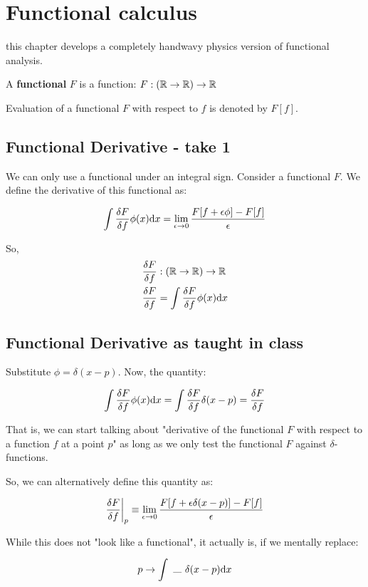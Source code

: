 \chapter{Functional calculus}

this chapter develops a completely handwavy physics version of functional
analysis.


\begin{definition}
    A \textbf{functional} $F$ is a function: $F : (\mathbb{R} \to \mathbb{R}) \to \mathbb{R}$
\end{definition}

\begin{notation}
Evaluation of a functional $F$ with respect to $f$ is denoted by $F[f]$.
\end{notation}

\section{Functional Derivative - take 1}

We can only use a functional under an integral sign. Consider a functional $F$.
We define the derivative of this functional as:

\begin{align*}
\int \fdv{F}{f} (x) \phi(x) \dd x = 
\lim_{\epsilon \to 0}
\frac{F[f + \epsilon \phi] - F[f]}{\epsilon}
\end{align*}

So,
\begin{align*}
    \fdv{F}{f} &: (\reals \to \reals) \to \reals \\
    \fdv{F}{f} (\phi) &=  \int \fdv{F}{f} (x) \phi(x) \dd x
\end{align*}

\section{Functional Derivative as taught in class}

Substitute $\phi = \delta (x - p)$. Now, the quantity:

\begin{align*}
    \int \fdv{F}{f}(x) \phi(x) \dd x = 
    \int \fdv{F}{f}(x) \delta (x - p) = 
    \fdv{F}{f} (p)
\end{align*}

That is, we can start talking about "derivative of the functional $F$ with
respect to a function $f$ at a point $p$" as long as we only test the functional $F$ against
$\delta$-functions.

So, we can alternatively define this quantity as:

\begin{align*}
\fdv{F}{f}{\bigg \rvert_p} \equiv 
\lim_{\epsilon \to 0} \frac{F[f + \epsilon \delta (x - p)] - F[f]}{\epsilon}
\end{align*}

While this does not "look like a functional", it actually is, if we
mentally replace:

\begin{align*}
    p \to  \int ~\rule{0.3cm}{0.1mm}~\delta (x - p) \dd x
\end{align*}

